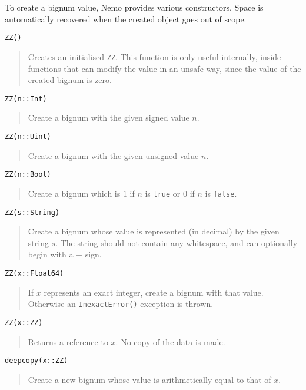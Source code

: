 \documentclass[a4paper,10pt]{article}
\newcommand{\code}{\lstinline}
\newcommand{\desc}[1]{\vspace{-5mm}\begin{quote}#1\end{quote}}
\begin{document}
{To create a bignum value, Nemo provides various constructors. Space is automatically
recovered when the created object goes out of scope.

\begin{lstlisting}
ZZ()
\end{lstlisting}

\desc{Creates an initialised \code{ZZ}. This function is only useful internally, 
inside functions that can modify the value in an unsafe way, since the value of the
created bignum is zero.}

\begin{lstlisting}
ZZ(n::Int)
\end{lstlisting}

\desc{Create a bignum with the given signed value $n$.}

\begin{lstlisting}
ZZ(n::Uint)
\end{lstlisting}

\desc{Create a bignum with the given unsigned value $n$.}

\begin{lstlisting}
ZZ(n::Bool)
\end{lstlisting}

\desc{Create a bignum which is $1$ if $n$ is \code{true} or $0$ if $n$ is 
\code{false}.}

\begin{lstlisting}
ZZ(s::String)
\end{lstlisting}

\desc{Create a bignum whose value is represented (in decimal) by the given string
$s$. The string should not contain any whitespace, and can optionally begin with
a $-$ sign.}

\begin{lstlisting}
ZZ(x::Float64)
\end{lstlisting}

\desc{If $x$ represents an exact integer, create a bignum with that value. Otherwise
an \code{InexactError()} exception is thrown.}

\begin{lstlisting}
ZZ(x::ZZ)
\end{lstlisting}

\desc{Returns a reference to $x$. No copy of the data is made.}

\begin{lstlisting}
deepcopy(x::ZZ)
\end{lstlisting}

\desc{Create a new bignum whose value is arithmetically equal to that of $x$.}

}
\end{document}
